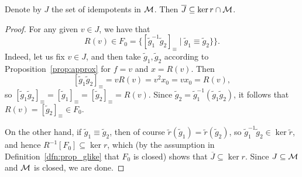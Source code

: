 	\begin{prop}
		\label{prop:id_clsd}
		Denote by $J$ the set of idempotents in ${\mathcal M}$. Then $\overline{J}\subseteq \ker r\cap {\mathcal M}$.
	\end{prop}
	\begin{proof}
		For any given $v\in J$, we have that
		\[
		R(v)\in F_0=\{[\tilde g_1^{-1}\tilde g_2]_{\equiv}\mid \tilde g_1\equiv \tilde g_2\} \}.
		\]
		Indeed, let us fix $v\in J$, and then take $\tilde g_1,\tilde g_2$ according to Proposition~\ref{prop:approx} for $f=v$ and $x=R(v)$. Then
		\[
			[\tilde g_1\tilde g_2]_\equiv=vR(v)=v^2x_0=vx_0=R(v),
		\]
		so $[\tilde g_1\tilde g_2]_\equiv=[\tilde g_1]_\equiv=[\tilde g_2]_\equiv=R(v)$. Since $\tilde g_2=\tilde g_1^{-1}(\tilde g_1\tilde g_2)$, it follows that $R(v)=[\tilde g_2]_\equiv\in F_0$.
		
		On the other hand, if $\tilde g_1\equiv \tilde g_2$, then of course $\tilde r(\tilde g_1)=\tilde r(\tilde g_2)$, so $\tilde g_1^{-1}\tilde g_2\in \ker \tilde r$, and hence $R^{-1}[F_0]\subseteq \ker r$, which (by the assumption in Definition~\ref{dfn:prop_glike}
		that $F_0$ is closed) shows that $\overline{J}\subseteq \ker r$. Since $J\subseteq {\mathcal M}$ and ${\mathcal M}$ is closed, we are done.
	\end{proof}
	

